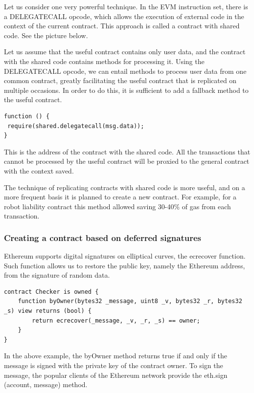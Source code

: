 \documentclass{article}
\begin{document}
Let us consider one very powerful technique. In the EVM instruction set, there is a DELEGATECALL opcode, which allows the execution of external code in the context of the current contract. This approach is called a contract with shared code. See the picture below.

Let us assume that the useful contract contains only user data, and the contract with the shared code contains methods for processing it. Using the DELEGATECALL opcode, we can entail methods to process user data from one common contract, greatly facilitating the useful contract that is replicated on multiple occasions. In order to do this, it is sufficient to add a fallback method to the useful contract.

\begin{lstlisting}
function () {
 require(shared.delegatecall(msg.data));
}
\end{lstlisting}

This is the address of the contract with the shared code. All the transactions that cannot be processed by the useful contract will be proxied to the general contract with the context saved.

The technique of replicating contracts with shared code is more useful, and on a more frequent basis it is planned to create a new contract. For example, for a robot liability contract this method allowed saving 30-40\% of gas from each transaction.

\subsubsection{Creating a contract based on deferred signatures}

Ethereum supports digital signatures on elliptical curves, the ecrecover function. Such function allows us to restore the public key, namely the Ethereum address, from the signature of random data.

\begin{lstlisting}
contract Checker is owned {
    function byOwner(bytes32 _message, uint8 _v, bytes32 _r, bytes32 _s) view returns (bool) {
        return ecrecover(_message, _v, _r, _s) == owner;
    }
}
\end{lstlisting}

In the above example, the byOwner method returns true if and only if the message is signed with the private key of the contract owner. To sign the message, the popular clients of the Ethereum network provide the eth.sign (account, message) method.
\end{document}
